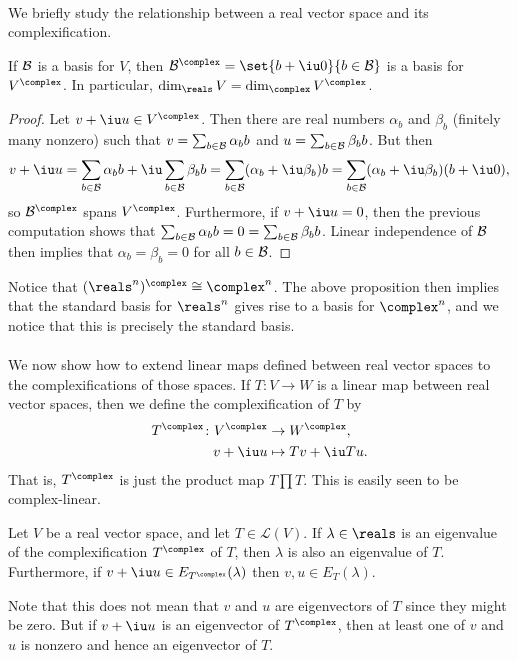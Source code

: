 \documentclass[a4paper, 11pt]{memoir}
\numberwithin{equation}{chapter}
\newcommand{\calL}{\mathcal{L}}
\newcommand{\newpar}{\paragraph{}}
\begin{document}
\newpar

We briefly study the relationship between a real vector space and its complexification.

\begin{proposition}
    If $\mathcal{B}$ is a basis for $V$, then $\calB^\complex = \set{b + \iu 0}{b \in \calB}$ is a basis for $V^\complex$. In particular, $\dim_\reals V = \dim_\complex V^\complex$.
\end{proposition}

\begin{proof}
    Let $v + \iu u \in V^\complex$. Then there are real numbers $\alpha_b$ and $\beta_b$ (finitely many nonzero) such that $v = \sum_{b \in \mathcal{B}} \alpha_b b$ and $u = \sum_{b \in \mathcal{B}} \beta_b b$. But then
    \begin{equation*}
        v + \iu u
            = \sum_{b \in \calB} \alpha_b b
                + \iu \sum_{b \in \calB} \beta_b b
            = \sum_{b \in \calB} (\alpha_b + \iu \beta_b) b
            = \sum_{b \in \calB} (\alpha_b + \iu \beta_b) (b + \iu 0),
    \end{equation*}
    so $\calB^\complex$ spans $V^\complex$. Furthermore, if $v + \iu u = 0$, then the previous computation shows that $\sum_{b \in \mathcal{B}} \alpha_b b = 0 = \sum_{b \in \mathcal{B}} \beta_b b$. Linear independence of $\mathcal{B}$ then implies that $\alpha_b = \beta_b = 0$ for all $b \in \mathcal{B}$.
\end{proof}

\begin{example}
    Notice that $(\reals^n)^\complex \cong \complex^n$. The above proposition then implies that the standard basis for $\reals^n$ gives rise to a basis for $\complex^n$, and we notice that this is precisely the standard basis.
\end{example}


\newpar

We now show how to extend linear maps defined between real vector spaces to the complexifications of those spaces. If $T \colon V \to W$ is a linear map between real vector spaces, then we define the complexification of $T$ by
%
\begin{align*}
    T^\complex \colon V^\complex &\to W^\complex, \\
    v + \iu u &\mapsto Tv + \iu Tu.
\end{align*}
%
That is, $T^\complex$ is just the product map $T \prod T$. This is easily seen to be complex-linear.

\begin{proposition}
    \label{prop:complexification-eigenvalue}
    Let $V$ be a real vector space, and let $T \in \calL(V)$. If $\lambda \in \reals$ is an eigenvalue of the complexification $T^\complex$ of $T$, then $\lambda$ is also an eigenvalue of $T$. Furthermore, if $v + \iu u \in E_{T^\complex}(\lambda)$ then $v,u \in E_T(\lambda)$.
\end{proposition}
%
Note that this does not mean that $v$ and $u$ are eigenvectors of $T$ since they might be zero. But if $v + \iu u$ is an eigenvector of $T^\complex$, then at least one of $v$ and $u$ is nonzero and hence an eigenvector of $T$.
\end{document}
